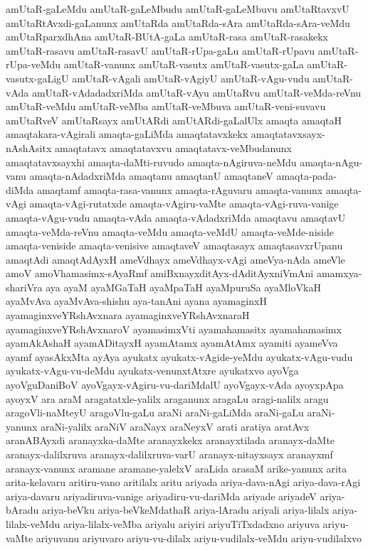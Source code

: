 {amUtaR-gaLeMdu
amUtaR-gaLeMbudu
amUtaR-gaLeMbuvu
amUtaRtavxvU
amUtaRtAvxdi-gaLanunx
amUtaRda
amUtaRda-sAra
amUtaRda-sAra-veMdu
amUtaRparxdhAna
amUtaR-BUtA-gaLa
amUtaR-rasa
amUtaR-rasakekx
amUtaR-rasavu
amUtaR-rasavU
amUtaR-rUpa-gaLu
amUtaR-rUpavu
amUtaR-rUpa-veMdu
amUtaR-vanunx
amUtaR-vasutx
amUtaR-vasutx-gaLa
amUtaR-vasutx-gaLigU
amUtaR-vAgali
amUtaR-vAgiyU
amUtaR-vAgu-vudu
amUtaR-vAda
amUtaR-vAdadadxriMda
amUtaR-vAyu
amUtaRvu
amUtaR-veMda-reVnu
amUtaR-veMdu
amUtaR-veMba
amUtaR-veMbuva
amUtaR-veni-suvavu
amUtaRveV
amUtaRsayx
amUtARdi
amUtARdi-gaLalUlx
amaqta
amaqtaH
amaqtakara-vAgirali
amaqta-gaLiMda
amaqtatavxkekx
amaqtatavxsayx-nAshAsitx
amaqtatavx
amaqtatavxvu
amaqtatavx-veMbudanunx
amaqtatavxsayxhi
amaqta-daMti-ruvudo
amaqta-nAgiruva-neMdu
amaqta-nAgu-vanu
amaqta-nAdadxriMda
amaqtanu
amaqtanU
amaqtaneV
amaqta-pada-diMda
amaqtamf
amaqta-rasa-vanunx
amaqta-rAguvaru
amaqta-vanunx
amaqta-vAgi
amaqta-vAgi-rutatxde
amaqta-vAgiru-vaMte
amaqta-vAgi-ruva-vanige
amaqta-vAgu-vudu
amaqta-vAda
amaqta-vAdadxriMda
amaqtavu
amaqtavU
amaqta-veMda-reVnu
amaqta-veMdu
amaqta-veMdU
amaqta-veMde-niside
amaqta-veniside
amaqta-venisive
amaqtaveV
amaqtasayx
amaqtasavxrUpanu
amaqtAdi
amaqtAdAyxH
ameVdhayx
ameVdhayx-vAgi
ameVya-nAda
ameVle
amoV
amoVhamasimx-sAyaRmf
amiBxnayxditAyx-dAditAyxniVmAni
amamxya-shariVra
aya
ayaM
ayaMGaTaH
ayaMpaTaH
ayaMpuruSa
ayaMloVkaH
ayaMvAva
ayaMvAva-shishu
aya-tanAni
ayana
ayamaginxH
ayamaginxveYRshAvxnara
ayamaginxveYRshAvxnaraH
ayamaginxveYRshAvxnaroV
ayamasimxVti
ayamahamasitx
ayamahamasimx
ayamAkAshaH
ayamADitayxH
ayamAtamx
ayamAtAmx
ayamiti
ayameVva
ayamf
ayasAkxMta
ayAya
ayukatx
ayukatx-vAgide-yeMdu
ayukatx-vAgu-vudu
ayukatx-vAgu-vu-deMdu
ayukatx-venunxtAtxre
ayukatxvo
ayoVga
ayoVguDaniBoV
ayoVgayx-vAgiru-vu-dariMdalU
ayoVgayx-vAda
ayoyxpApa
ayoyxV
ara
araM
aragatatxle-yalilx
araganunx
aragaLu
aragi-nalilx
aragu
aragoVli-naMteyU
aragoVlu-gaLu
araNi
araNi-gaLiMda
araNi-gaLu
araNi-yanunx
araNi-yalilx
araNiV
araNayx
araNeyxV
arati
aratiya
aratAvx
aranABAyxdi
aranayxka-daMte
aranayxkekx
aranayxtilada
aranayx-daMte
aranayx-dalilxruva
aranayx-dalilxruva-varU
aranayx-nitayxsayx
aranayxmf
aranayx-vanunx
aramane
aramane-yalelxV
araLida
arasaM
arike-yanunx
arita
arita-kelavaru
aritiru-vano
aritilalx
aritu
ariyada
ariya-dava-nAgi
ariya-dava-rAgi
ariya-davaru
ariyadiruva-vanige
ariyadiru-vu-dariMda
ariyade
ariyadeV
ariya-bAradu
ariya-beVku
ariya-beVkeMdathaR
ariya-lAradu
ariyali
ariya-lilalx
ariya-lilalx-veMdu
ariya-lilalx-veMba
ariyalu
ariyiri
ariyuTiTxdadxno
ariyuva
ariyu-vaMte
ariyuvanu
ariyuvaro
ariyu-vu-dilalx
ariyu-vudilalx-veMdu
ariyu-vudilalxvo
}
